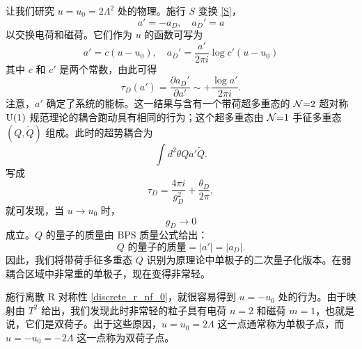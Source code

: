 让我们研究 $u=u_0=2\Lambda^2$ 处的物理。施行 $S$ 变换 \eqref{S}，
\begin{equation}
a'=-a_D,\quad
a_D'=a
\end{equation}
以交换电荷和磁荷。它们作为 $u$ 的函数可写为
\begin{equation}
a'=c(u-u_0),\quad
a_D'=\frac{a'}{2\pi i}\log c'(u-u_0)\label{cc}
\end{equation}
其中 $c$ 和 $c'$ 是两个常数，由此可得
\begin{equation}
\tau_D(a')=\frac{\partial a_D'}{\partial a'}\sim +\frac{\log a'}{2\pi i}.\label{dual_run}
\end{equation}
注意，$a'$ 确定了系统的能标。这一结果与含有一个带荷超多重态的 $\mathcal{N}{=}2$ 超对称 ${\mathrm{U}}(1)$ 规范理论的耦合跑动具有相同的行为；这个超多重态由 $\mathcal{N}{=}1$ 手征多重态 $(Q,\tilde Q)$ 组成。此时的超势耦合为
\begin{equation}
\int d^2\theta Qa'\tilde Q.
\end{equation}
写成
\begin{equation}
\tau_D=\frac{4\pi i}{g_D^2} + \frac{\theta_D}{2\pi},
\end{equation}
就可发现，当 $u\to u_0$ 时，
\begin{equation}
g_D\to 0
\end{equation}
成立。$Q$ 的量子的质量由 BPS 质量公式给出：
\begin{equation}
\text{$Q$ 的量子的质量}=|a'|=|a_D|.
\end{equation}
因此，我们将带荷手征多重态 $Q$ 识别为原理论中单极子的二次量子化版本。在弱耦合区域中非常重的单极子，现在变得非常轻。

施行离散 R 对称性 \eqref{discrete_r_nf_0}，就很容易得到 $u=-u_0$ 处的行为。由于映射由 $T^2$ 给出，我们发现此时非常轻的粒子具有电荷 $n=2$ 和磁荷 $m=1$，也就是说，它们是双荷子。出于这些原因，$u=u_0=2\Lambda$ 这一点通常称为单极子点，而 $u=-u_0=-2\Lambda$ 这一点称为双荷子点。

